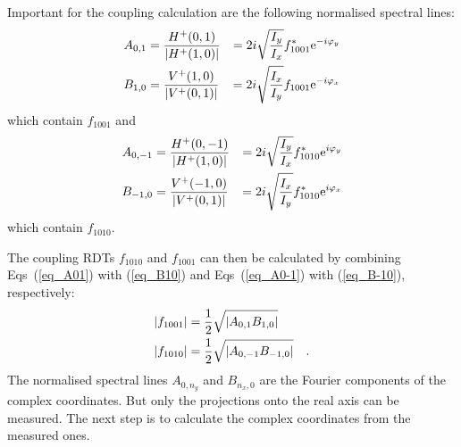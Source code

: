 %
Important for the coupling calculation are the following normalised spectral lines:
%
\begin{align}
    A_{0,1}&=\frac{H^+(0,1)}{\left|H^+(1,0)\right|}
      &= 2i\sqrt{\frac{I_y}{I_x}}f_{1001}^* \text{e}^{-i\varphi_{y}}
    \label{eq_A01} \\
    B_{1,0}&=\frac{V^+(1,0)}{\left|V^+(0,1)\right|}
      &= 2i\sqrt{\frac{I_x}{I_y}}{f_{1001}} \text{e}^{-i\varphi_{x}}
    \label{eq_B10}
\end{align}
which contain $f_{1001}$ and
\begin{align}
    A_{0,-1}&=\frac{H^+(0,-1)}{\left|H^+(1,0)\right|}
      &= 2i\sqrt{\frac{I_y}{I_x}}f_{1010}^* \text{e}^{i\varphi_{y}}
    \label{eq_A0-1} \\
    B_{-1,0}&=\frac{V^+(-1,0)}{\left|V^+(0,1)\right|}
      &= 2i\sqrt{\frac{I_x}{I_y}}f_{1010}^* \text{e}^{i\varphi_{x}}
    \label{eq_B-10}
\end{align}
%
which contain $f_{1010}$.

The coupling RDTs $f_{1010}$ and $f_{1001}$ can then be calculated by combining Eqs~(\ref{eq_A01}) with (\ref{eq_B10})
and Eqs~(\ref{eq_A0-1}) with (\ref{eq_B-10}), respectively:
%
\begin{align}
    \left|f_{1001}\right| &= \frac{1}{2}\sqrt{\left| A_{0,1}B_{1,0} \right|} \notag \\
    \left|f_{1010}\right| &= \frac{1}{2}\sqrt{\left| A_{0,-1}B_{-1,0} \right|}
    \label{eq_abs_f_from_AB}
    \quad .
\end{align}
%
The normalised spectral lines $A_{0,n_y}$ and $B_{n_x,0}$ are the Fourier components of the complex
coordinates. But only the projections onto the real axis can be measured. The next step is to calculate
the complex coordinates from the measured ones.

